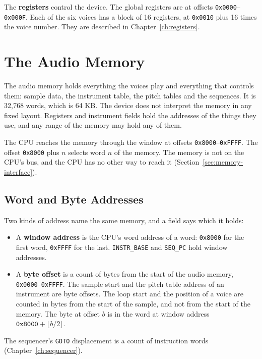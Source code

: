 The \textbf{registers} control the device. The global registers are at offsets \texttt{0x0000}--\texttt{0x000F}. Each
of the six voices has a block of 16 registers, at \texttt{0x0010} plus 16 times the voice number. They are described in
Chapter~\ref{ch:registers}.

\section{The Audio Memory}
\label{sec:audio-memory}

The audio memory holds everything the voices play and everything that controls them: sample data, the instrument table,
the pitch tables and the sequences. It is 32,768 words, which is 64 KB. The device does not interpret the memory in any
fixed layout. Registers and instrument fields hold the addresses of the things they use, and any range of the memory
may hold any of them.

The CPU reaches the memory through the window at offsets \texttt{0x8000}--\texttt{0xFFFF}. The offset \texttt{0x8000}
plus $n$ selects word $n$ of the memory. The memory is not on the CPU's bus, and the CPU has no other way to reach it
(Section~\ref{sec:memory-interface}).

\subsection{Word and Byte Addresses}
\label{sec:byte-offsets}

Two kinds of address name the same memory, and a field says which it holds:

\begin{itemize}
	\item A \textbf{window address} is the CPU's word address of a word: \texttt{0x8000} for the first word, \texttt{0xFFFF} for
	      the last. \texttt{INSTR\_BASE} and \texttt{SEQ\_PC} hold window addresses.
	\item A \textbf{byte offset} is a count of bytes from the start of the audio memory, \texttt{0x0000}--\texttt{0xFFFF}. The
	      sample start and the pitch table address of an instrument are byte offsets. The loop start and the position of a voice
	      are counted in bytes from the start of the sample, and not from the start of the memory. The byte at offset $b$ is in
	      the word at window address $\texttt{0x8000} + \lfloor b/2 \rfloor$.
\end{itemize}

The sequencer's \texttt{GOTO} displacement is a count of instruction words (Chapter~\ref{ch:sequencer}).

